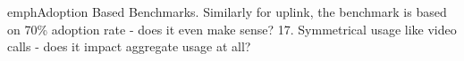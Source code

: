  emph{Adoption Based Benchmarks.} Similarly for uplink, the benchmark is based on 70\% adoption rate - does it even make sense? 17. Symmetrical usage like video calls - does it impact aggregate usage at all?

